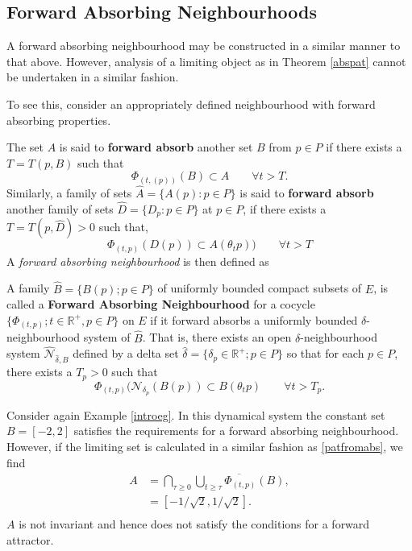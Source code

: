 \subsection{Forward Absorbing Neighbourhoods}
\label{secFAN}

A forward absorbing neighbourhood may be constructed in a similar
manner to that above. However, analysis of a limiting object as in Theorem
\ref{abspat}  cannot be undertaken in a similar fashion.

To see this, consider an appropriately defined
neighbourhood with forward absorbing properties.

The set $A$ is said to {\bf forward absorb} another set
$B$ from $p \in P$ if there exists a $T = T(p,B)$ such that
\[ \Phi_{(t, (p))}(B) \subset A \qquad \forall t > T. \]
Similarly, a family of sets $\hat{A} = \{A(p):p \in P \}$ is
said to {\bf forward absorb} another family of sets $\hat{D} = \{D_p:p \in
P\}$ at $p \in P$, if there exists a $T=T(p,\hat{D}) >0$ such that,
\[ \Phi_{(t, p)}(D(p)) \subset A( \theta_{t}p)) \qquad
             \forall t > T \]
A {\em forward absorbing neighbourhood} is then defined as

\begin{defn} \label{FANdef}
   A family $\hat{B}=\{B(p);p \in P\}$ of uniformly bounded compact subsets
   of $E$, is called a {\bf Forward Absorbing Neighbourhood} for a
   cocycle $\{\Phi_{(t,p)}; t \in \mathbb{R}^{+},p \in P\}$ on $E$
   if it forward absorbs a uniformly bounded $\delta$-neighbourhood
   system of $\hat{B}$. That is, there exists an open
   $\delta$-neighbourhood system
   $\hat{\mathcal{N}}_{\hat{\delta},\hat{B}}$ defined by a delta set
   $\hat{\delta} = \{\delta_p \in \mathbb{R}^+; p\in P\}$ so that for each
   $p \in P$, there exists a $T_p>0$ such that
   \begin{equation}
     \Phi_{(t, p)}(\mathcal{N}_{\delta_p}(B(p))
     \subset B(\theta_t p) \qquad \forall t > T_p.
   \end{equation}
\end{defn}

\begin{eg}
Consider again Example \ref{introeg}. In this dynamical system
the constant set $B=[-2,2]$ satisfies the requirements for a forward absorbing
neighbourhood. However, if the limiting set is calculated in a similar fashion
as \ref{patfromabs}, we find
\begin{align*}
A &= \bigcap_{\tau \geq 0} \overline{\bigcup_{t \geq \tau} \Phi_{(t,p)}(B)}, \\
  &= [ -1/ \sqrt{2}, 1/ \sqrt{2}]. \\
\end{align*}
$A$ is not invariant and hence does not satisfy the conditions for
a forward attractor.
\end{eg}


